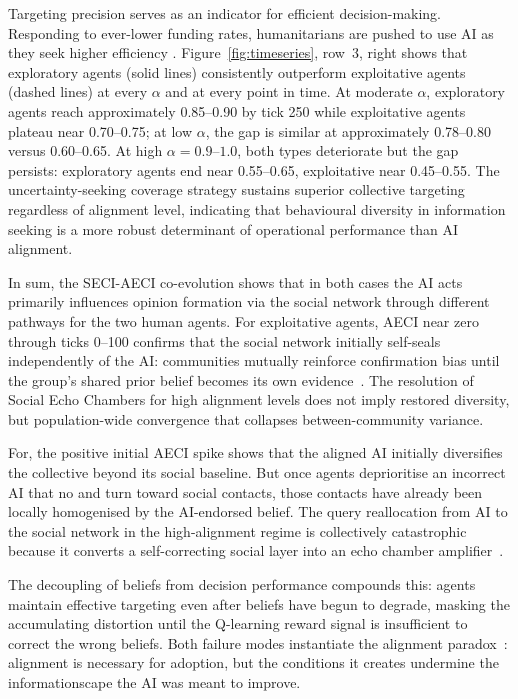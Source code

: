 \documentclass[pdflatex,sn-apa]{sn-jnl}%
\begin{document}
Targeting precision serves as an indicator for efficient decision-making. Responding to ever-lower funding rates, humanitarians are pushed to use AI as they seek higher efficiency \citep{behl2026grass}. Figure~\ref{fig:timeseries}, row~3, right shows that exploratory agents (solid lines) consistently outperform exploitative agents (dashed lines) at every $\alpha$ and at every point in time. At moderate $\alpha$, exploratory agents reach approximately 0.85--0.90 by tick 250 while exploitative agents plateau near 0.70--0.75; at low $\alpha$, the gap is similar at approximately 0.78--0.80 versus 0.60--0.65. At high $\alpha = 0.9$--$1.0$, both types deteriorate 
but the gap persists: exploratory agents end near 
0.55--0.65, exploitative near 0.45--0.55. The 
uncertainty-seeking coverage strategy sustains 
superior collective targeting regardless of 
alignment level, indicating that behavioural 
diversity in information seeking is a more robust 
determinant of operational performance than AI 
alignment.

In sum, the SECI-AECI co-evolution shows that in both cases the AI acts primarily influences opinion formation via the social network through different pathways for the two human agents. For exploitative agents, AECI near zero through ticks 0--100 confirms that the social network initially self-seals independently of the AI: communities mutually reinforce confirmation bias until the group's shared prior belief becomes its own evidence~\citep{lorenz2011, comes2020}. The resolution of Social Echo Chambers for high alignment levels does not imply restored diversity, but population-wide convergence that collapses between-community variance. 

For, the positive initial AECI spike shows that the aligned AI initially diversifies the collective beyond its social baseline. But once agents deprioritise an incorrect AI that no and turn toward social
contacts, those contacts have already been locally
homogenised by the AI-endorsed belief. The query reallocation from AI to the social network in the high-alignment regime is collectively catastrophic because it
converts a self-correcting social layer into an echo
chamber amplifier~\citep{Bail2018}. 

The decoupling of beliefs from decision performance
compounds this: agents maintain effective targeting
even after beliefs have begun to degrade, masking the
accumulating distortion until the Q-learning reward signal is insufficient to correct the wrong beliefs. Both failure modes instantiate the alignment
paradox~\citep{WestAydin2025}: alignment is necessary
for adoption, but the conditions it creates undermine
the informationscape the AI was meant to improve.
\end{document}
